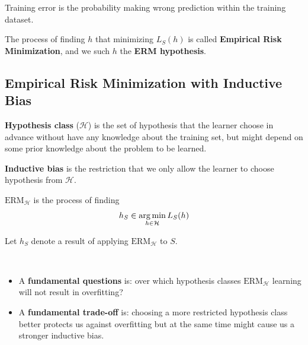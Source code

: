 \begin{intuition}
    Training error is the probability making wrong prediction within the training dataset.
\end{intuition}

\begin{definition}
The process of finding $h$ that minimizing $L_S(h)$ is called \textbf{Empirical Risk Minimization}, and we such $h$ the \textbf{ERM hypothesis}.
\end{definition}

\subsection{Empirical Risk Minimization with Inductive Bias} \label{sec:}

\begin{definition}
\textbf{Hypothesis class} ($\mathcal{H}$) is the set of hypothesis that the learner choose in advance without have any knowledge about the training set, but might depend on some prior knowledge about the problem to be learned.
\end{definition}

\begin{definition}
\textbf{Inductive bias} is the restriction that we only allow the learner to choose hypothesis from $\mathcal{H}$.
\end{definition}

\begin{definition}
$\text{ERM}_\mathcal{H}$ is the process of finding
    \begin{align*}
        h_S \in \operatorname*{arg\,min}_{h \in \mathcal{H}} L_S(h)
    \end{align*} 
\end{definition}

\begin{notation}
    Let $h_S$ denote a result of applying $\text{ERM}_\mathcal{H}$ to $S$.
\end{notation}

\begin{remark} ~
    \begin{itemize}
        \item A \textbf{fundamental questions} is: over which hypothesis classes $\text{ERM}_\mathcal{H}$ learning will not result in overfitting?
        \item A \textbf{fundamental trade-off} is: choosing a more restricted hypothesis class better protects us against overfitting but at the same time might cause us a stronger inductive bias. 
    \end{itemize}
\end{remark}

